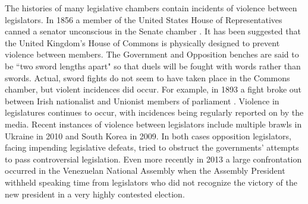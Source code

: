 \documentclass[a4paper]{article}\usepackage[]{graphicx}\usepackage[]{color}
\begin{document}
The histories of many legislative chambers contain incidents of violence between legislators. In 1856 a member of the United States House of Representatives canned a senator unconscious in the Senate chamber \citep{USSenateCanning}. It has been suggested that the United Kingdom's House of Commons is physically designed to prevent violence between members. The Government and Opposition benches are said to be ``two sword lengths apart" \citep{ParliamentUKSword} so that duels will be fought with words rather than swords. Actual, sword fights do not seem to have taken place in the Commons chamber, but violent incidences did occur. For example, in 1893 a fight broke out between Irish nationalist and Unionist members of parliament \citep{ByrneViolence}. Violence in legislatures continues to occur, with incidences being regularly reported on by the media. Recent instances of violence between legislators include multiple brawls in Ukraine in 2010 and South Korea in 2009. In both cases opposition legislators, facing impending legislative defeats, tried to obstruct the governments' attempts to pass controversial legislation. Even more recently in 2013 a large confrontation occurred in the Venezuelan National Assembly when the Assembly President withheld speaking time from legislators who did not recognize the victory of the new president in a very highly contested election.
\end{document}
